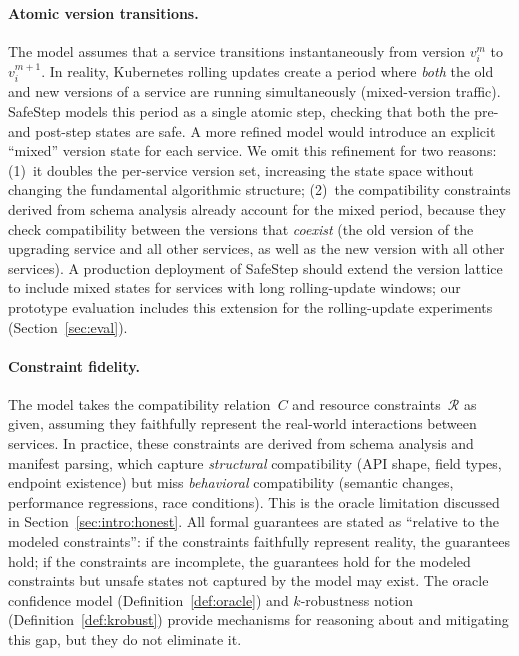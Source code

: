 \documentclass[10pt,twocolumn]{article}
\begin{document}
\paragraph{Atomic version transitions.}
The model assumes that a service transitions instantaneously from version
$v_i^m$ to $v_i^{m+1}$.  In reality, Kubernetes rolling updates create a
period where \emph{both} the old and new versions of a service are running
simultaneously (mixed-version traffic).  SafeStep models this period as a
single atomic step, checking that both the pre- and post-step states are
safe.  A more refined model would introduce an explicit ``mixed'' version
state for each service.  We omit this refinement for two reasons: (1)~it
doubles the per-service version set, increasing the state space without
changing the fundamental algorithmic structure; (2)~the compatibility
constraints derived from schema analysis already account for the mixed
period, because they check compatibility between the versions that
\emph{coexist} (the old version of the upgrading service and all other
services, as well as the new version with all other services).  A
production deployment of SafeStep should extend the version lattice to
include mixed states for services with long rolling-update windows; our
prototype evaluation includes this extension for the rolling-update
experiments (Section~\ref{sec:eval}).

\paragraph{Constraint fidelity.}
The model takes the compatibility relation~$C$ and resource
constraints~$\mathcal{R}$ as given, assuming they faithfully represent the
real-world interactions between services.  In practice, these constraints
are derived from schema analysis and manifest parsing, which capture
\emph{structural} compatibility (API shape, field types, endpoint
existence) but miss \emph{behavioral} compatibility (semantic changes,
performance regressions, race conditions).  This is the oracle limitation
discussed in Section~\ref{sec:intro:honest}.  All formal guarantees are
stated as ``relative to the modeled constraints'': if the constraints
faithfully represent reality, the guarantees hold; if the constraints are
incomplete, the guarantees hold for the modeled constraints but unsafe
states not captured by the model may exist.  The oracle confidence model
(Definition~\ref{def:oracle}) and $k$-robustness notion
(Definition~\ref{def:krobust}) provide mechanisms for reasoning about and
mitigating this gap, but they do not eliminate it.
\end{document}
